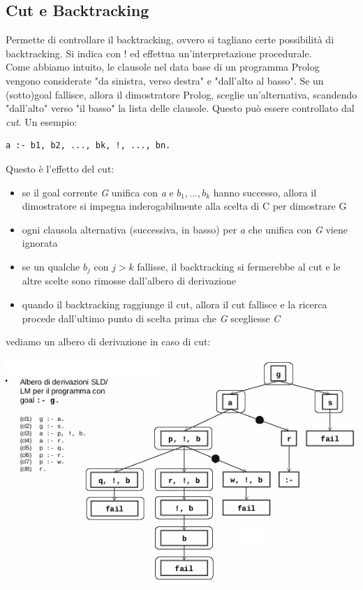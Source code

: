 \documentclass[a4paper,12pt, oneside]{book}
\begin{document}
\subsection{Cut e Backtracking}
Permette di controllare il backtracking, ovvero si tagliano certe possibilità di backtracking. Si indica con $!$ ed effettua un'interpretazione procedurale. \\
Come abbiamo intuito, le clausole nel data base di un programma
Prolog vengono considerate "da sinistra, verso destra" e "dall'alto al
basso". Se un (sotto)goal fallisce, allora il dimostratore Prolog, sceglie un'alternativa, scandendo "dall'alto" verso "il basso" la lista delle clausole. Questo può essere controllato dal \textit{cut}. Un esempio:
\begin{verbatim}
a :- b1, b2, ..., bk, !, ..., bn.
\end{verbatim}
Questo è l'effetto del cut:
\begin{itemize}
	\item se il goal corrente \textit{G} unifica con \textit{a} e $b_1,...,b_k$ hanno successo, allora il dimostratore si impegna inderogabilmente alla scelta di C per dimostrare G
	\item ogni clausola alternativa (successiva, in basso) per \textit{a} che unifica con \textit{G} viene ignorata
	\item se un qualche $b_j$ con $j > k$ fallisse, il backtracking si fermerebbe al cut e le altre scelte sono rimosse dall'albero di derivazione
	\item quando il backtracking raggiunge il cut, allora il cut fallisce e la ricerca procede dall'ultimo punto di scelta prima che \textit{G} scegliesse \textit{C}
\end{itemize}
vediamo un albero di derivazione in caso di cut:
\begin{center}
	\includegraphics[scale=0.8]{img/cut.png}
\end{center}
\end{document}
